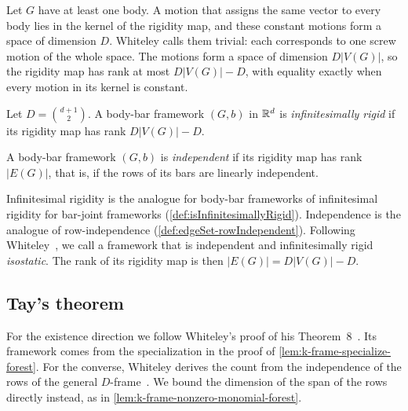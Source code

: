 Let $G$ have at least one body. A motion that assigns the same vector
to every body lies in the kernel of the rigidity map, and these
constant motions form a space of dimension $D$. Whiteley calls them
trivial: each corresponds to one screw motion of the whole space. The
motions form a space of dimension $D|V(G)|$, so the rigidity map has
rank at most $D|V(G)| - D$, with equality exactly when every motion in
its kernel is constant.

\begin{definition}
  \label{def:infinitesimally-rigid-body-bar}
  \leanok
  Let $D = \binom{d+1}{2}$. A body-bar framework $(G, b)$ in ${\mathbb{R}}^d$ is
  \emph{infinitesimally rigid} if its rigidity map has rank
  $D|V(G)| - D$.
\end{definition}

\begin{definition}
  \label{def:independent-body-bar}
  \leanok
  A body-bar framework $(G, b)$ is \emph{independent} if its rigidity
  map has rank $|E(G)|$, that is, if the rows of its bars are linearly
  independent.
\end{definition}

Infinitesimal rigidity is the analogue for body-bar frameworks of
infinitesimal rigidity for bar-joint frameworks
(\cref{def:isInfinitesimallyRigid}). Independence is the analogue of
row-independence (\cref{def:edgeSet-rowIndependent}). Following
Whiteley~\cite[\S2.3]{whiteley1988}, we call a framework that is
independent and infinitesimally rigid \emph{isostatic}. The rank of its
rigidity map is then $|E(G)| = D|V(G)| - D$.

\subsection{Tay's theorem}
\label{sec:body-bar-tay}

For the existence direction we follow Whiteley's proof of his
Theorem~8~\cite{whiteley1988}. Its framework comes from the
specialization in the proof of \cref{lem:k-frame-specialize-forest}.
For the converse, Whiteley derives the count from the independence of
the rows of the general $D$-frame~\cite[proof of
Corollary~3]{whiteley1988}. We bound the dimension of the span of the
rows directly instead, as in \cref{lem:k-frame-nonzero-monomial-forest}.

